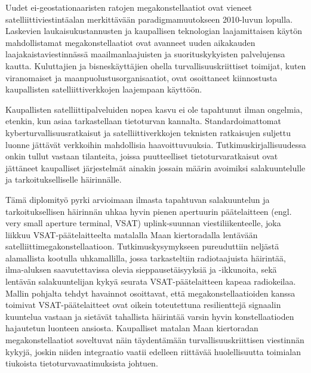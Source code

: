 \documentclass[english, 12pt, a4paper, elec, utf8, a-1b, online]{aaltothesis}
\begin{document}
\begin{abstractpage}[finnish]
  Uudet ei-geostationaaristen ratojen megakonstellaatiot ovat vieneet satelliittiviestintäalan merkittävään paradigmamuutokseen 2010-luvun lopulla. Laskevien laukaisukustannusten ja kaupallisen teknologian laajamittaisen käytön mahdollistamat megakonstellaatiot ovat avanneet uuden aikakauden laajakaistaviestinnässä maailmanlaajuisten ja suorituskykyisten palvelujensa kautta. Kuluttajien ja bisneskäyttäjien ohella turvallisuuskriittiset toimijat, kuten viranomaiset ja maanpuolustusorganisaatiot, ovat osoittaneet kiinnostusta kaupallisten satelliittiverkkojen laajempaan käyttöön.

  Kaupallisten satelliittipalveluiden nopea kasvu ei ole tapahtunut ilman ongelmia, etenkin, kun asiaa tarkastellaan tietoturvan kannalta. Standardoimattomat kyberturvallisuusratkaisut ja satelliittiverkkojen teknisten ratkaisujen suljettu luonne jättävät verkkoihin mahdollisia haavoittuvuuksia.
  Tutkimuskirjallisuudessa onkin tullut vastaan tilanteita, joissa puutteelliset tietoturvaratkaisut ovat jättäneet kaupalliset järjestelmät ainakin jossain määrin avoimiksi salakuuntelulle ja tarkoitukselliselle häirinnälle.
  
  Tämä diplomityö pyrki arvioimaan ilmasta tapahtuvan salakuuntelun ja tarkoituksellisen häirinnän uhkaa hyvin pienen apertuurin päätelaitteen (engl. very small aperture terminal, VSAT) uplink-suunnan viestiliikenteelle, joka liikkuu VSAT-päätelaitteelta matalalla Maan kiertoradalla lentävään satelliittimegakonstellaatioon. Tutkimuskysymykseen pureuduttiin neljästä alamallista kootulla uhkamallilla, jossa tarkasteltiin radiotaajuista häirintää, ilma-aluksen saavutettavissa olevia sieppausetäisyyksiä ja -ikkunoita, sekä lentävän salakuuntelijan kykyä seurata VSAT-päätelaitteen kapeaa radiokeilaa. Mallin pohjalta tehdyt havainnot osoittavat, että megakonstellaatioiden kanssa toimivat VSAT-päätelaitteet ovat oikein toteutettuna resilienttejä signaalin kuuntelua vastaan ja sietävät tahallista häirintää varsin hyvin konstellaatioden hajautetun luonteen ansiosta. Kaupalliset matalan Maan kiertoradan megakonstellaatiot soveltuvat näin täydentämään turvallisuuskriittisen viestinnän kykyjä, joskin niiden integraatio vaatii edelleen riittävää huolellisuutta toimialan tiukoista tietoturvavaatimuksista johtuen.
\end{abstractpage}

\end{document}
